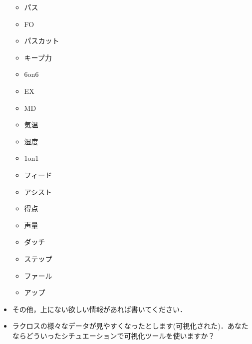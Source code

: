 \documentclass[sotsuron]{kuee}
\begin{document}
\begin{itemize}
\begin{itemize}
				\item パス
				\item FO
				\item パスカット
				\item キープ力
				\item 6on6
				\item EX
				\item MD
				\item 気温
				\item 湿度
				\item 1on1
				\item フィード
				\item アシスト
				\item 得点
				\item 声量
				\item ダッチ
				\item ステップ
				\item ファール
				\item アップ
			\end{itemize}
		\item その他，上にない欲しい情報があれば書いてください．
		\item ラクロスの様々なデータが見やすくなったとします(可視化された)．あなたならどういったシチュエーションで可視化ツールを使いますか？
	\end{itemize}

\end{document}
